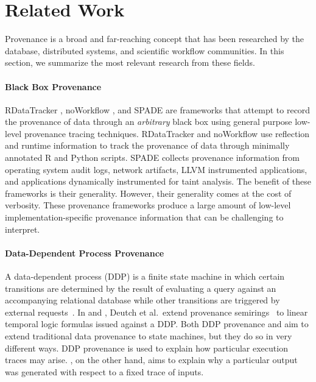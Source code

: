 \section{Related Work}
%
%
Provenance is a broad and far-reaching concept that has been researched by the
database, distributed systems, and scientific workflow communities. In this
section, we summarize the most relevant research from these fields.

\paragraph{Black Box Provenance}
RDataTracker \cite{lerner2014collecting}, noWorkflow
\cite{murta2014noworkflow}, and SPADE \cite{gehani2012spade} are frameworks
that attempt to record the provenance of data through an \emph{arbitrary} black
box using general purpose low-level provenance tracing techniques. RDataTracker
and noWorkflow use reflection and runtime information to track the provenance
of data through minimally annotated R and Python scripts. SPADE collects
provenance information from operating system audit logs, network artifacts,
LLVM instrumented applications, and applications dynamically instrumented for
taint analysis. The benefit of these frameworks is their generality. However,
their generality comes at the cost of verbosity. These provenance frameworks
produce a large amount of low-level implementation-specific provenance
information that can be challenging to interpret.

\paragraph{Data-Dependent Process Provenance}
A data-dependent process (DDP) is a finite state machine in which certain
transitions are determined by the result of evaluating a query against an
accompanying relational database while other transitions are triggered by
external requests~\cite{deutch2014provenance, deutch2015provenance}. In
\cite{deutch2014provenance} and \cite{deutch2015provenance}, Deutch et al.\
extend provenance semirings~\cite{green2007provenance} to linear temporal logic
formulas issued against a DDP.
%
Both DDP provenance and \watprovenance{} aim to extend traditional data
provenance to state machines, but they do so in very different ways. DDP
provenance is used to explain how particular execution traces may arise.
%
%
\Watprovenance{}, on the other hand, aims to explain why a particular output
was generated with respect to a fixed trace of inputs.

